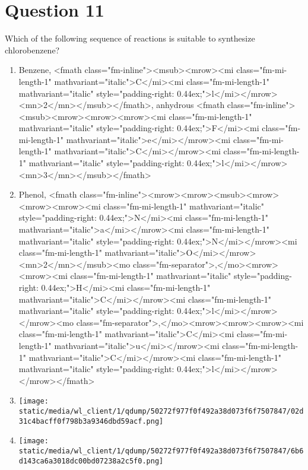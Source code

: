 \documentclass{article}
\begin{document}
\section*{Question 11}
Which of the following sequence of reactions is suitable to synthesize chlorobenzene? 
\begin{enumerate}[label=(\alph*)]
\item  Benzene, <fmath class="fm-inline"><msub><mrow><mi class="fm-mi-length-1" mathvariant="italic">C</mi><mi class="fm-mi-length-1" mathvariant="italic" style="padding-right: 0.44ex;">l</mi></mrow><mn>2</mn></msub></fmath>, anhydrous <fmath class="fm-inline"><msub><mrow><mrow><mrow><mi class="fm-mi-length-1" mathvariant="italic" style="padding-right: 0.44ex;">F</mi><mi class="fm-mi-length-1" mathvariant="italic">e</mi></mrow><mi class="fm-mi-length-1" mathvariant="italic">C</mi></mrow><mi class="fm-mi-length-1" mathvariant="italic" style="padding-right: 0.44ex;">l</mi></mrow><mn>3</mn></msub></fmath> 
\item  Phenol, <fmath class="fm-inline"><mrow><mrow><msub><mrow><mrow><mrow><mi class="fm-mi-length-1" mathvariant="italic" style="padding-right: 0.44ex;">N</mi><mi class="fm-mi-length-1" mathvariant="italic">a</mi></mrow><mi class="fm-mi-length-1" mathvariant="italic" style="padding-right: 0.44ex;">N</mi></mrow><mi class="fm-mi-length-1" mathvariant="italic">O</mi></mrow><mn>2</mn></msub><mo class="fm-separator">,</mo><mrow><mrow><mi class="fm-mi-length-1" mathvariant="italic" style="padding-right: 0.44ex;">H</mi><mi class="fm-mi-length-1" mathvariant="italic">C</mi></mrow><mi class="fm-mi-length-1" mathvariant="italic" style="padding-right: 0.44ex;">l</mi></mrow></mrow><mo class="fm-separator">,</mo><mrow><mrow><mrow><mi class="fm-mi-length-1" mathvariant="italic">C</mi><mi class="fm-mi-length-1" mathvariant="italic">u</mi></mrow><mi class="fm-mi-length-1" mathvariant="italic">C</mi></mrow><mi class="fm-mi-length-1" mathvariant="italic" style="padding-right: 0.44ex;">l</mi></mrow></mrow></fmath>
\item \texttt{[image: static/media/wl\_client/1/qdump/50272f977f0f492a38d073f6f7507847/02d31c4bacff0f798b3a9346dbd59acf.png]}
\item \texttt{[image: static/media/wl\_client/1/qdump/50272f977f0f492a38d073f6f7507847/6b6d143ca6a3018dc00bd07238a2c5f0.png]}
\end{enumerate}
\newpage
\end{document}
